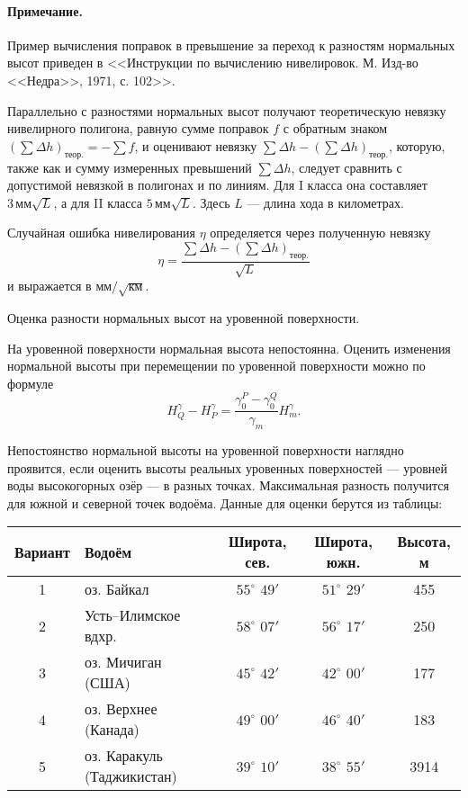 \documentclass[11pt, a4paper,addpoints]{exam}
\theoremstyle{remark}
\begin{document}
\begin{questions}
    \paragraph{Примечание.} Пример вычисления поправок в превышение за переход к разностям нормальных высот приведен в
    <<Инструкции по вычислению нивелировок. М. Изд-во <<Недра>>, 1971, с. 102>>.

    Параллельно с разностями нормальных высот получают теоретическую невязку нивелирного полигона,
    равную сумме поправок $f$ с обратным знаком $(\sum\Delta h)_\textrm{теор.} =  -\sum f$, и
    оценивают невязку $\sum\Delta h - (\sum\Delta h)_\textrm{теор.}$, которую, также как и сумму
    измеренных превышений $\sum\Delta h$, следует сравнить с 
    допустимой невязкой в полигонах и по линиям. Для I класса она составляет 
    $3\,\textrm{мм}\sqrt{L}$, 
    а для II класса $5\,\textrm{мм}\sqrt{L}$. Здесь $L$ --- длина хода в километрах.

    Случайная ошибка нивелирования $\eta$ определяется через полученную невязку
    \begin{equation*}
        \eta = \dfrac{\sum\Delta h - (\sum\Delta h)_\textrm{теор.}}{\sqrt{L}}
    \end{equation*}
    и выражается в $\textrm{мм} / \sqrt{\textrm{км}}$.

    \question Оценка разности нормальных высот на уровенной поверхности.

    На уровенной поверхности нормальная высота непостоянна. Оценить изменения нормальной высоты при
    перемещении по уровенной поверхности можно по формуле
    \begin{equation*}
        H_Q^\gamma - H_P^\gamma = \dfrac{\gamma_0^P - \gamma_0^Q}{\gamma_m} H_m^\gamma.
    \end{equation*}

    Непостоянство нормальной высоты на уровенной поверхности наглядно проявится, если оценить высоты
    реальных уровенных поверхностей --- уровней воды высокогорных озёр --- в разных точках.
    Максимальная разность получится для южной  и северной точек водоёма. Данные для оценки берутся
    из таблицы:
    \begin{table}[H]
        \centering
        \begin{tabular}{|c|l|c|c|c|}
            \hline
            Вариант & Водоём & Широта, сев. & Широта, южн. & Высота, м \\\hline
            1 & оз. Байкал & $55^\circ$ $49'$ & $51^\circ$ $29'$ & 455 \\ 
            2 & Усть--Илимское вдхр. & $58^\circ$ $07'$ & $56^\circ$ $17'$ & 250 \\ 
            3 & оз. Мичиган (США) & $45^\circ$ $42'$ & $42^\circ$ $00'$ & 177 \\ 
            4 & оз. Верхнее (Канада) & $49^\circ$ $00'$ & $46^\circ$ $40'$ & 183 \\ 
            5 & оз. Каракуль (Таджикистан) & $39^\circ$ $10'$ & $38^\circ$ $55'$ & 3914 \\ 
            \hline
        \end{tabular}
    \end{table}


\end{questions}
\end{document}
